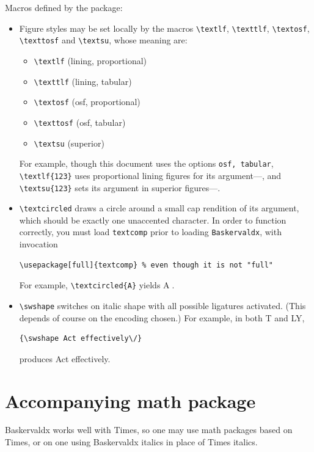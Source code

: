 \documentclass[11pt]{article}
\begin{document}
Macros defined by the package:
\begin{itemize}
\item
Figure styles may be set locally by the macros \verb|\textlf|, \verb|\texttlf|, \verb|\textosf|, \verb|\texttosf| and \verb|\textsu|, whose meaning are:
\begin{itemize}
\item
\verb|\textlf| (lining, proportional)
\item \verb|\texttlf| (lining, tabular)
\item \verb|\textosf| (osf, proportional)
\item \verb|\texttosf| (osf, tabular)
\item \verb|\textsu| (superior)
\end{itemize}
For example, though this document uses the options {\tt osf, tabular}, \verb|\textlf{123}| uses proportional lining figures for its argument---, and  \verb|\textsu{123}| sets its argument in superior figures---.
\item \verb|\textcircled| draws a circle around a small cap rendition of its argument, which should be exactly one unaccented character. In order to function correctly, you must load \verb|textcomp| prior to loading {\tt Baskervaldx}, with invocation
\begin{verbatim}
\usepackage[full]{textcomp} % even though it is not "full"
\end{verbatim}
For example, \verb|\textcircled{A}| yields \textcircled{A}.
\item \verb|\swshape| switches on italic shape with all possible ligatures activated. (This depends of course on the encoding chosen.) For example, in both T and LY,
\begin{verbatim}
{\swshape Act effectively\/}
\end{verbatim}
 produces {\swshape Act effectively\/}. 
\end{itemize}
\section{Accompanying math package}
Baskervaldx works well with Times, so one may use math packages based on Times, or on one using Baskervaldx italics in place of Times italics.
 
\end{document}
